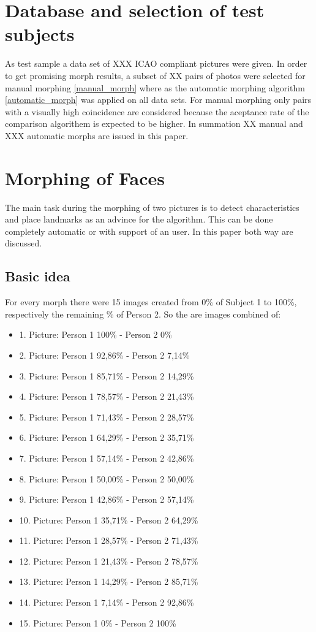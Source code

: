 \section{Database and selection of test subjects}
As test sample a data set of XXX ICAO compliant pictures were given. In order to get promising morph results, a subset of XX  pairs of photos were selected for manual morphing \ref{manual_morph} where as the automatic morphing algorithm \ref{automatic_morph} was applied on all data sets. For manual  morphing only pairs with a visually high coincidence are considered because the aceptance rate of the comparison algorithem is expected to be higher. 
In summation XX manual and XXX automatic morphs are issued in this paper. 


\section{Morphing of Faces}
The main task during the morphing of two pictures is to detect characteristics and place landmarks as an advince for the algorithm. This can be done completely automatic or with support of an user. In this paper both way are discussed.  
\subsection{Basic idea}
\label{percentageMorph}
For every morph there were 15 images created from 0\% of Subject 1 to 100\%, respectively the remaining \% of Person 2. So the are images combined of:
\begin{itemize}
	\item 1. Picture: Person 1 100\% - Person 2 0\%
	\item 2. Picture: Person 1 92,86\% - Person 2 7,14\%
	\item 3. Picture: Person 1 85,71\% - Person 2 14,29\%
	\item 4. Picture: Person 1 78,57\% - Person 2 21,43\%
	\item 5. Picture: Person 1 71,43\% - Person 2 28,57\%
	\item 6. Picture: Person 1 64,29\% - Person 2 35,71\%
	\item 7. Picture: Person 1 57,14\% - Person 2 42,86\%
	\item 8. Picture: Person 1 50,00\% - Person 2 50,00\%
	\item 9. Picture: Person 1 42,86\% - Person 2 57,14\%
	\item 10. Picture: Person 1 35,71\% - Person 2 64,29\%
	\item 11. Picture: Person 1 28,57\% - Person 2 71,43\%
	\item 12. Picture: Person 1 21,43\% - Person 2 78,57\%
	\item 13. Picture: Person 1 14,29\% - Person 2 85,71\%
	\item 14. Picture: Person 1 7,14\% - Person 2 92,86\%
	\item 15. Picture: Person 1 0\% - Person 2 100\%
	\end{itemize}

